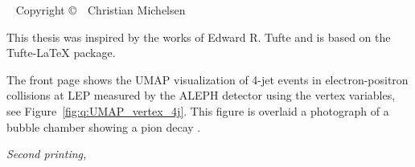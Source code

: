 
\newpage
\begin{fullwidth}
~\vfill
\thispagestyle{empty}
\setlength{\parindent}{0pt}
\setlength{\parskip}{\baselineskip}
Copyright \copyright\ \the\year\ \newline Christian Michelsen

\par{}


This thesis was inspired by the works of Edward R. Tufte and is based on the Tufte-\LaTeX\xspace package. 


\noindent The front page shows the UMAP visualization of 4-jet events in electron-positron collisions at LEP measured by the ALEPH detector using the vertex variables, see Figure~\ref{fig:q:UMAP_vertex_4j}. This figure is overlaid a photograph of a bubble chamber showing a pion decay \autocite{desyBubbleChamberPhotograph}. 

\par\textit{Second printing, \monthyear}
\end{fullwidth}